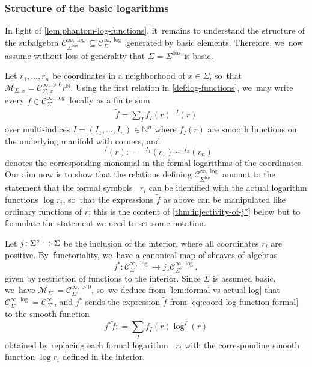 \documentclass[10pt]{amsart}
\newcommand\hto{\mathrel{\lhook\joinrel\to}}
\theoremstyle{definition}
\theoremstyle{remark}
\newcommand{\NN}{\mathbb{N}}
\newcommand{\ulog}{\mathop{\widetilde{\log}}\nolimits}
\newcommand{\uf}{\widetilde{f}}
\newcommand{\defas}{\mathrel{\mathop:}=}
\newcommand{\cM}{\mathscr{M}}
\newcommand{\Cinf}[1]{\mathscr{C}^{\infty}_{#1}}
\newcommand{\Cinfpos}[1]{\mathscr{C}^{\infty, > 0}_{#1}}
\newcommand{\Cinflog}[1]{\mathscr{C}^{\infty,\log}_{#1}}
\newcommand{\Sig}{\Sigma}
\newcommand{\bas}[1]{{#1}^{\mathrm{bas}}}
\newcommand{\Sigbas}{\bas{\Sig}}
\newcommand{\intSig}{\Sigma^\circ}
\begin{document}
\subsubsection{Structure of the basic logarithms}
In light of \autoref{lem:phantom-log-functions}, it~remains to understand the structure of the subalgebra $\Cinflog{\Sigbas}\subseteq \Cinflog{\Sig}$ generated by basic elements. Therefore, we~now assume without loss of generality that $\Sig = \Sigbas$ is basic.

Let $r_1,\ldots,r_n$ be coordinates in a neighborhood of $x \in \Sig$, so~that $\cM_{\Sig,x}=\Cinfpos{\Sig,x}r^\NN$. Using the first relation in \autoref{def:log-functions}, we~may write every $\uf \in \Cinflog{\Sig}$ locally as a finite sum
\begin{align}
\uf = \sum_{I} f_I(r) \ulog{}\!^I(r)\label{eq:coord-log-function-formal}
\end{align}
over multi-indices $I=(I_1,\ldots,I_n) \in \NN^n$ where $f_I(r)$ are smooth functions on the underlying manifold with corners, and
\[
\ulog{}\!^I(r) \defas \ulog{}\!^{I_1}(r_1) \cdots \ulog{}\!^{I_n}(r_n)
\]
denotes the corresponding monomial in the formal logarithms of the coordinates. Our aim now is to show that the relations defining $\Cinflog{\Sigbas}$ amount to the statement that the formal symbols $\ulog r_i$ can be identified with the actual logarithm functions $\log r_i$, so~that the expressions $\uf$ as above can be manipulated like ordinary functions of $r$; this is the content of \autoref{thm:injectivity-of-j*} below but to formulate the statement we need to set some notation.

Let $j \colon \intSig \hto \Sig$ be the inclusion of the interior, where all coordinates $r_i$ are positive. By~functoriality, we~have a canonical map of sheaves of algebras
\begin{equation*}
j^*\colon \Cinflog{\Sig} \to j_*\Cinflog{\intSig},
\end{equation*}
given by restriction of functions to the interior. Since $\Sig$ is assumed basic, we~have $\cM_{\intSig} = \Cinfpos{\intSig}$, so~we deduce from \autoref{lem:formal-vs-actual-log} that $\Cinflog{\intSig} = \Cinf{\intSig}$, and $j^*$ sends the expression $\uf$ from \eqref{eq:coord-log-function-formal} to the smooth function
\begin{equation}\label{eq:coord-log-function-interior}
j^*\uf \defas \sum_{I} f_{I}(r) \log^I(r)
\end{equation}
obtained by replacing each formal logarithm $\ulog r_i$ with the corresponding smooth function $\log r_i$ defined in the interior.
\end{document}
